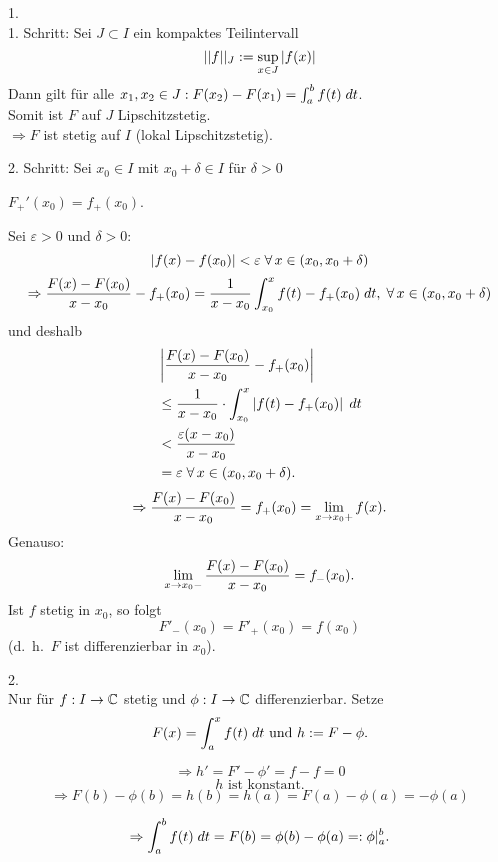 \documentclass[../ana2.tex]{subfiles}
\begin{document}
\begin{bew}
    1.\\
    1. Schritt: Sei \( J \subset I \) ein kompaktes 
    Teilintervall 
    \[ ||f||_J := \underset{x\in J}{\sup} \abs{f(x)} \]
    Dann gilt für alle \( x_1, x_2 \in J: F(x_2)-F(x_1)
    = \integralx{f(t)}{a}{b}{t} \). \\
    Somit ist \(F\) auf \(J\) Lipschitzstetig.\\
    \(\Rightarrow F\) ist stetig auf \(I\) 
    (lokal Lipschitzstetig).
    
    2. Schritt: Sei \(x_0 \in I\) mit 
    \(x_0 + \delta \in I \)
    für \(\delta > 0\)
    \begin{beh}
        \(F_+'(x_0) = f_+(x_0) \).
    \end{beh}
    \begin{bew}
        Sei \(\varepsilon > 0 \) und \(\delta > 0\):
        \[ \abs{f(x)-f(x_0)} < \varepsilon 
        \; \forall x \in (x_0, x_0 + \delta) \]
        \[ \Rightarrow \frac{F(x) - F(x_0)}{x - x_0} 
        - f_+(x_0) 
        = \frac{1}{x - x_0} 
        \integralx{f(t) - f_+(x_0)}{x_0}{x}{t}, 
        \; \forall x \in (x_0, x_0+ \delta)\]
        und deshalb
        \begin{align*}
            &\abs{\frac{F(x)-F(x_0)}{x-x_0} - f_+(x_0)} \\
            &\leq \frac{1}{x-x_0} \cdot 
            \integralx{\abs{f(t)-f_+(x_0)}}{x_0}{x}{t} \\
            &< \frac{ \varepsilon (x - x_0) }{x - x_0} \\
            &= \varepsilon \;\forall x\in (x_0, x_0 + \delta).
        \end{align*}
        \[ \Rightarrow \frac{F(x) - F(x_0)}{x - x_0} 
        = f_+(x_0) = \limesx{x}{x_0+} f(x). \]
        Genauso:
        \[ \limesx{x}{x_0-} \frac{F(x) - F(x_0)}{x - x_0} 
        = f_-(x_0). \]    
        Ist \(f\) stetig in \(x_0\), so folgt 
        \[ F'_-(x_0) = F'_+(x_0) = f(x_0) \]
        (d.\ h.\  \(F\) ist differenzierbar in \(x_0\)).
    \end{bew}

    2.\\
    Nur für \( \abb{f}{I}{\C} \) stetig und 
    \( \abb{\phi}{I}{\C} \) differenzierbar.
    Setze 
    \[ F(x) = \integralx{f(t)}{a}{x}{t} \text{ und }
    h := F - \phi. \]

    \[ \Rightarrow h' = F' - \phi' = f - f = 0 \]
    \[ h \text{ ist konstant.} \]
    \[ \Rightarrow F(b) - \phi(b) = h(b) = h(a) = F(a)- \phi(a)
    = -\phi(a) \]

    \[ \Rightarrow \integralx{f(t)}{a}{b}{t} 
    = F(b) = \phi(b) - \phi(a) 
    =: \phi \vert_a^b. \]
\end{bew}
\end{document}
